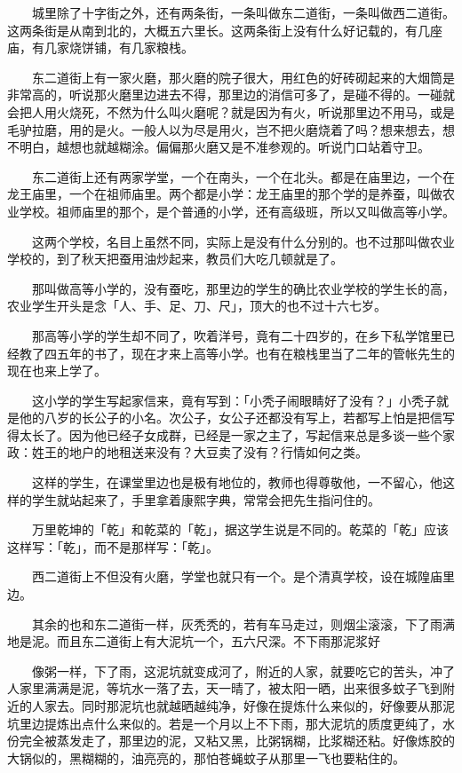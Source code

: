 \documentclass[UTF8]{ctexart}
\begin{document}
　　城里除了十字街之外，还有两条街，一条叫做东二道街，一条叫做西二道街。这两条街是从南到北的，大概五六里长。这两条街上没有什么好记载的，有几座庙，有几家烧饼铺，有几家粮栈。

　　东二道街上有一家火磨，那火磨的院子很大，用红色的好砖砌起来的大烟筒是非常高的，听说那火磨里边进去不得，那里边的消信可多了，是碰不得的。一碰就会把人用火烧死，不然为什么叫火磨呢？就是因为有火，听说那里边不用马，或是毛驴拉磨，用的是火。一般人以为尽是用火，岂不把火磨烧着了吗？想来想去，想不明白，越想也就越糊涂。偏偏那火磨又是不准参观的。听说门口站着守卫。

　　东二道街上还有两家学堂，一个在南头，一个在北头。都是在庙里边，一个在龙王庙里，一个在祖师庙里。两个都是小学：龙王庙里的那个学的是养蚕，叫做农业学校。祖师庙里的那个，是个普通的小学，还有高级班，所以又叫做高等小学。

　　这两个学校，名目上虽然不同，实际上是没有什么分别的。也不过那叫做农业学校的，到了秋天把蚕用油炒起来，教员们大吃几顿就是了。

　　那叫做高等小学的，没有蚕吃，那里边的学生的确比农业学校的学生长的高，农业学生开头是念「人、手、足、刀、尺」，顶大的也不过十六七岁。

　　那高等小学的学生却不同了，吹着洋号，竟有二十四岁的，在乡下私学馆里已经教了四五年的书了，现在才来上高等小学。也有在粮栈里当了二年的管帐先生的现在也来上学了。

　　这小学的学生写起家信来，竟有写到：「小秃子闹眼睛好了没有？」小秃子就是他的八岁的长公子的小名。次公子，女公子还都没有写上，若都写上怕是把信写得太长了。因为他已经子女成群，已经是一家之主了，写起信来总是多谈一些个家政：姓王的地户的地租送来没有？大豆卖了没有？行情如何之类。

　　这样的学生，在课堂里边也是极有地位的，教师也得尊敬他，一不留心，他这样的学生就站起来了，手里拿着康熙字典，常常会把先生指问住的。

　　万里乾坤的「乾」和乾菜的「乾」，据这学生说是不同的。乾菜的「乾」应该这样写：「乾」，而不是那样写：「乾」。

　　西二道街上不但没有火磨，学堂也就只有一个。是个清真学校，设在城隍庙里边。

　　其余的也和东二道街一样，灰秃秃的，若有车马走过，则烟尘滚滚，下了雨满地是泥。而且东二道街上有大泥坑一个，五六尺深。不下雨那泥浆好

　　像粥一样，下了雨，这泥坑就变成河了，附近的人家，就要吃它的苦头，冲了人家里满满是泥，等坑水一落了去，天一晴了，被太阳一晒，出来很多蚊子飞到附近的人家去。同时那泥坑也就越晒越纯净，好像在提炼什么来似的，好像要从那泥坑里边提炼出点什么来似的。若是一个月以上不下雨，那大泥坑的质度更纯了，水份完全被蒸发走了，那里边的泥，又粘又黑，比粥锅糊，比浆糊还粘。好像炼胶的大锅似的，黑糊糊的，油亮亮的，那怕苍蝇蚊子从那里一飞也要粘住的。
\end{document}
